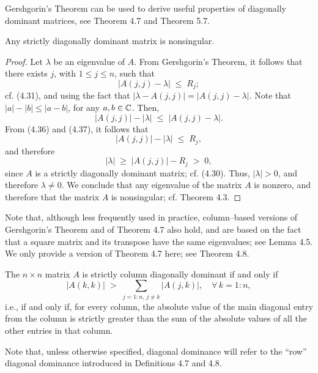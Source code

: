 Gershgorin's Theorem can be used to derive useful properties of diagonally dominant
matrices, see Theorem 4.7 and Theorem 5.7.

\begin{theorem}
Any strictly diagonally dominant matrix is nonsingular.
\end{theorem}

\begin{proof}
Let $\lambda$ be an eigenvalue of $A$. From Gershgorin's Theorem, it follows that there
exists $j$, with $1 \leq j \leq n$, such that
\begin{equation}
|A(j,j) - \lambda| \;\leq\; R_j;
\end{equation}
cf. (4.31), and using the fact that $|\lambda - A(j,j)| = |A(j,j) - \lambda|$. Note that
$|a| - |b| \leq |a-b|$, for any $a, b \in \mathbb{C}$. Then,
\begin{equation}
|A(j,j)| - |\lambda| \;\leq\; |A(j,j) - \lambda|.
\end{equation}
From (4.36) and (4.37), it follows that
\[
|A(j,j)| - |\lambda| \;\leq\; R_j,
\]
and therefore
\[
|\lambda| \;\geq\; |A(j,j)| - R_j \;>\; 0,
\]
since $A$ is a strictly diagonally dominant matrix; cf. (4.30).
Thus, $|\lambda| > 0$, and therefore $\lambda \neq 0$. We conclude that any eigenvalue
of the matrix $A$ is nonzero, and therefore that the matrix $A$ is nonsingular; cf.
Theorem 4.3.
\end{proof}

Note that, although less frequently used in practice, column--based versions of
Gershgorin's Theorem and of Theorem 4.7 also hold, and are based on the fact that a
square matrix and its transpose have the same eigenvalues; see Lemma 4.5. We only
provide a version of Theorem 4.7 here; see Theorem 4.8.

\begin{definition}
The $n \times n$ matrix $A$ is strictly column diagonally dominant if and only if
\begin{equation}
|A(k,k)| \;>\; \sum_{j=1:n,\, j \neq k} |A(j,k)|, \quad \forall\, k = 1:n,
\end{equation}
i.e., if and only if, for every column, the absolute value of the main diagonal entry
from the column is strictly greater than the sum of the absolute values of all the
other entries in that column.
\end{definition}

Note that, unless otherwise specified, diagonal dominance will refer to the ``row''
diagonal dominance introduced in Definitions 4.7 and 4.8.

